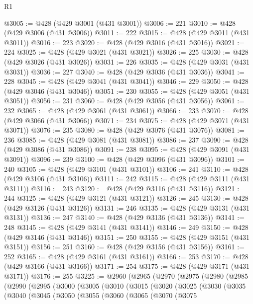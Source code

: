\begin{lexlean}{R1}
\begin{coremodule}
@3005 := @428 (@429 @3001 (@431 @3001))
@3006 := 221
@3010 := @428 (@429 @3006 (@431 @3006))
@3011 := 222
@3015 := @428 (@429 @3011 (@431 @3011))
@3016 := 223
@3020 := @428 (@429 @3016 (@431 @3016))
@3021 := 224
@3025 := @428 (@429 @3021 (@431 @3021))
@3026 := 225
@3030 := @428 (@429 @3026 (@431 @3026))
@3031 := 226
@3035 := @428 (@429 @3031 (@431 @3031))
@3036 := 227
@3040 := @428 (@429 @3036 (@431 @3036))
@3041 := 228
@3045 := @428 (@429 @3041 (@431 @3041))
@3046 := 229
@3050 := @428 (@429 @3046 (@431 @3046))
@3051 := 230
@3055 := @428 (@429 @3051 (@431 @3051))
@3056 := 231
@3060 := @428 (@429 @3056 (@431 @3056))
@3061 := 232
@3065 := @428 (@429 @3061 (@431 @3061))
@3066 := 233
@3070 := @428 (@429 @3066 (@431 @3066))
@3071 := 234
@3075 := @428 (@429 @3071 (@431 @3071))
@3076 := 235
@3080 := @428 (@429 @3076 (@431 @3076))
@3081 := 236
@3085 := @428 (@429 @3081 (@431 @3081))
@3086 := 237
@3090 := @428 (@429 @3086 (@431 @3086))
@3091 := 238
@3095 := @428 (@429 @3091 (@431 @3091))
@3096 := 239
@3100 := @428 (@429 @3096 (@431 @3096))
@3101 := 240
@3105 := @428 (@429 @3101 (@431 @3101))
@3106 := 241
@3110 := @428 (@429 @3106 (@431 @3106))
@3111 := 242
@3115 := @428 (@429 @3111 (@431 @3111))
@3116 := 243
@3120 := @428 (@429 @3116 (@431 @3116))
@3121 := 244
@3125 := @428 (@429 @3121 (@431 @3121))
@3126 := 245
@3130 := @428 (@429 @3126 (@431 @3126))
@3131 := 246
@3135 := @428 (@429 @3131 (@431 @3131))
@3136 := 247
@3140 := @428 (@429 @3136 (@431 @3136))
@3141 := 248
@3145 := @428 (@429 @3141 (@431 @3141))
@3146 := 249
@3150 := @428 (@429 @3146 (@431 @3146))
@3151 := 250
@3155 := @428 (@429 @3151 (@431 @3151))
@3156 := 251
@3160 := @428 (@429 @3156 (@431 @3156))
@3161 := 252
@3165 := @428 (@429 @3161 (@431 @3161))
@3166 := 253
@3170 := @428 (@429 @3166 (@431 @3166))
@3171 := 254
@3175 := @428 (@429 @3171 (@431 @3171))
@3176 := 255
@3225 := @2960
    (@2965
      (@2970
        (@2975
          (@2980
            (@2985
              (@2990
                (@2995
                  (@3000
                    (@3005
                      (@3010
                        (@3015
                          (@3020
                            (@3025
                              (@3030
                                (@3035
                                  (@3040
                                    (@3045
                                      (@3050
                                        (@3055
                                          (@3060
                                            (@3065
                                              (@3070
                                                (@3075

\end{coremodule}
\end{lexlean}
